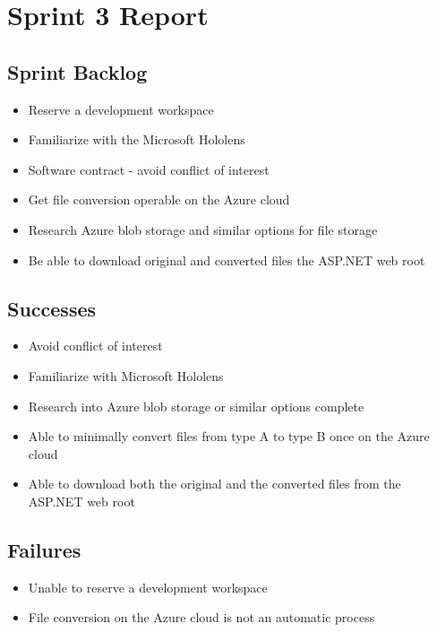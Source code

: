 
\section{Sprint 3 Report}
\label{sec:Sprint3_report}
    \subsection{Sprint Backlog}
    \label{sec:Sprint3_backlog}
        \begin{itemize}
            \item Reserve a development workspace
            \item Familiarize with the Microsoft Hololens
            \item Software contract - avoid conflict of interest
            \item Get file conversion operable on the Azure cloud
            \item Research Azure blob storage and similar options for file storage
            \item Be able to download original and converted files the ASP.NET web root
        \end{itemize}

    \subsection{Successes}
    \label{sec:Sprint3_successes}
        \begin{itemize}
            \item Avoid conflict of interest
            \item Familiarize with Microsoft Hololens
            \item Research into Azure blob storage or similar options complete
            \item Able to minimally convert files from type A to type B once on the Azure cloud
            \item Able to download both the original and the converted files from the ASP.NET web root
        \end{itemize}

    \subsection{Failures}
    \label{sec:Sprint3_failures}
        \begin{itemize}
            \item Unable to reserve a development workspace
            \item File conversion on the Azure cloud is not an automatic process
        \end{itemize}

